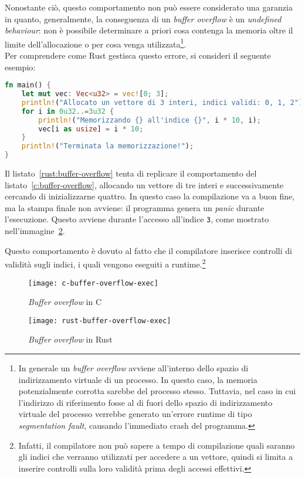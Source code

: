 Nonostante ciò, questo comportamento non può essere considerato una garanzia in quanto, generalmente, la conseguenza di un \textit{buffer overflow} è un \textit{undefined behaviour}: 
non è possibile determinare a priori cosa contenga la memoria oltre
il limite dell'allocazione o per cosa venga utilizzata\footnote{In generale un \textit{buffer overflow} avviene all'interno dello spazio
di indirizzamento virtuale di un processo. In questo caso, la memoria potenzialmente corrotta sarebbe
 del processo stesso. Tuttavia, nel caso in cui l'indirizzo di riferimento
 fosse al di fuori dello spazio di indirizzamento virtuale del processo verrebbe generato un'errore runtime di tipo \textit{segmentation fault}, 
 causando l'immediato crash del programma.}. \hfill
\vspace{10pt}\\
\noindent Per comprendere come Rust gestisca questo errore, si consideri il seguente esempio:
\begin{lstlisting}[language=Rust, caption={Buffer overflow in Rust}, label={rust:buffer-overflow}]
fn main() {
    let mut vec: Vec<u32> = vec![0; 3];
    println!("Allocato un vettore di 3 interi, indici validi: 0, 1, 2");
    for i in 0u32..=3u32 {    
        println!("Memorizzando {} all'indice {}", i * 10, i);
        vec[i as usize] = i * 10;
    }
    println!("Terminata la memorizzazione!");
}
\end{lstlisting}
Il listato~\ref{rust:buffer-overflow} tenta di replicare il comportamento del listato~\ref{c:buffer-overflow}, 
allocando un vettore di tre interi e successivamente cercando di inizializzarne quattro. 
In questo caso la compilazione va a buon fine, ma la stampa finale non avviene: il programma genera un \textit{panic} durante l'esecuzione. Questo avviene
durante l'accesso all'indice \texttt{3}, come mostrato nell'immagine~\ref{rust:buffer-overflow-exec}.

Questo comportamento è dovuto al fatto che il compilatore inserisce controlli di validità sugli indici, i quali vengono eseguiti a runtime.\footnote{Infatti, il compilatore non può sapere a tempo di compilazione quali saranno gli indici che verranno utilizzati per accedere a un vettore, quindi si limita a inserire controlli sulla loro validità prima degli accessi effettivi.}
\begin{figure}[htbp]
\begin{center}
    \texttt{[image: c-buffer-overflow-exec]}
    \caption{\textit{Buffer overflow} in C}\label{c:buffer-overflow-exec}
    \end{center}
\end{figure}
\begin{figure}[htbp]
\begin{center}
    \texttt{[image: rust-buffer-overflow-exec]}
    \caption{\textit{Buffer overflow} in Rust}\label{rust:buffer-overflow-exec}
    \end{center}
\end{figure}


